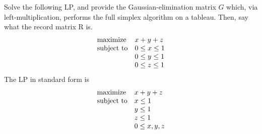 \documentclass[12pt]{article}
\newenvironment{exercise}[2][Exercise]{\begin{trivlist}
		\item[\hskip \labelsep {\bfseries #1}\hskip \labelsep {\bfseries #2.}]}{\end{trivlist}}
\begin{document}
	\begin{exercise}{4} Solve the following LP, and provide the Gaussian-elimination matrix $G$ which, via left-multiplication, performs the full simplex algorithm on a tableau. Then, say what the record matrix R is.
		\begin{equation*}
			\begin{array}{ll@{}ll}
				\text{maximize}  & \displaystyle x+y+z &\\
				\text{subject to}& \displaystyle 0 \leq x \leq 1   \\
				& \displaystyle 0 \leq y \leq 1 \\
				& \displaystyle 0 \leq z \leq 1 \\
			\end{array}
		\end{equation*}
		The LP in standard form is 
		\begin{equation*}
			\begin{array}{ll@{}ll}
				\text{maximize}  & \displaystyle x+y+z &\\
				\text{subject to}& \displaystyle x \leq 1   \\
				& \displaystyle y \leq 1 \\
				& \displaystyle z \leq 1 \\
				& \displaystyle 0 \leq x,y,z
			\end{array}
		\end{equation*}
		

\end{exercise}
\end{document}
